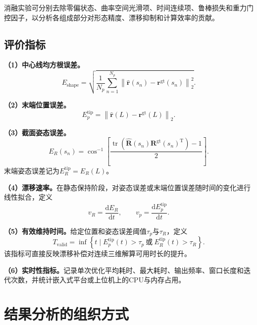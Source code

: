 消融实验可分别去除零偏状态、曲率空间光滑项、时间连续项、鲁棒损失和重力门控因子，以分析各组成部分对形态精度、漂移抑制和计算效率的贡献。

\subsection{评价指标}

\textbf{（1）中心线均方根误差。}
\begin{equation}
    E_{\mathrm{shape}}
    =\sqrt{
    \frac{1}{N_p}
    \sum_{n=1}^{N_p}
    \left\|
    \hat{\bm r}(s_n)-\bm r^{\mathrm{gt}}(s_n)
    \right\|_2^2
    }.
    \label{eq:shape_rmse}
\end{equation}

\textbf{（2）末端位置误差。}
\begin{equation}
    E_{p}^{\mathrm{tip}}
    =\left\|
    \hat{\bm r}(L)-\bm r^{\mathrm{gt}}(L)
    \right\|_2.
\end{equation}

\textbf{（3）截面姿态误差。}
\begin{equation}
    E_{R}(s_n)
    =\cos^{-1}\left[
    \frac{\operatorname{tr}
    \left(
    \hat{\bm R}(s_n)
    \bm R^{\mathrm{gt}}(s_n)^{\mathrm T}
    \right)-1}{2}
    \right].
    \label{eq:orientation_geodesic_error}
\end{equation}
末端姿态误差记为$E_R^{\mathrm{tip}}=E_R(L)$。

\textbf{（4）漂移速率。}在静态保持阶段，对姿态误差或末端位置误差随时间的变化进行线性拟合，定义
\begin{equation}
    v_R=\frac{\mathrm d E_R}{\mathrm d t},
    \qquad
    v_p=\frac{\mathrm d E_p^{\mathrm{tip}}}{\mathrm d t}.
\end{equation}

\textbf{（5）有效维持时间。}给定位置和姿态误差阈值$\tau_p$与$\tau_R$，定义
\begin{equation}
    T_{\mathrm{valid}}
    =\inf\left\{
    t\mid
    E_p^{\mathrm{tip}}(t)>\tau_p
    \ \text{或}\ 
    E_R^{\mathrm{tip}}(t)>\tau_R
    \right\}.
    \label{eq:valid_duration}
\end{equation}
该指标可直接反映漂移补偿对连续三维解算可用时长的提升。

\textbf{（6）实时性指标。}记录单次优化平均耗时、最大耗时、输出频率、窗口长度和迭代次数，并统计嵌入式平台或上位机上的CPU与内存占用。

\section{结果分析的组织方式}
\label{sec:result_writing_template}

